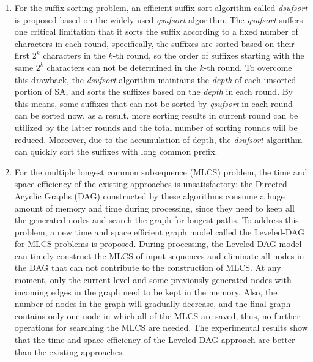 \begin{englishabstract}
\begin{enumerate}
  \item For the suffix sorting problem, an efficient suffix sort
    algorithm called \emph{dsufsort} is proposed based on the widely
    used \emph{qsufsort} algorithm. The \emph{qsufsort} suffers one
    critical limitation that it sorts the suffix according to a fixed
    number of characters in each round, specifically, the suffixes are
    sorted based on their first $2^k$ characters in the $k$-th round,
    so the order of suffixes starting with the same $2^k$ characters
    can not be determined in the $k$-th round. To overcome this
    drawback, the \emph{dsufsort} algorithm maintains the \emph{depth}
    of each unsorted portion of SA, and sorts the suffixes based on
    the \emph{depth} in each round. By this means, some suffixes that
    can not be sorted by \emph{qsufsort} in each round can be sorted
    now, as a result, more sorting results in current round can be
    utilized by the latter rounds and the total number of sorting
    rounds will be reduced. Moreover, due to the accumulation of
    depth, the \emph{dsufsort} algorithm can quickly sort the suffixes
    with long common prefix.

  \item For the multiple longest common subsequence (MLCS) problem,
    the time and space efficiency of the existing approaches is
    unsatisfactory: the Directed Acyclic Graphs (DAG) constructed by
    these algorithms consume a huge amount of memory and time during
    processing, since they need to keep all the generated nodes and
    search the graph for longest paths. To address this problem, a new
    time and space efficient graph model called the Leveled-DAG for
    MLCS problems is proposed. During processing, the Leveled-DAG
    model can timely construct the MLCS of input sequences and
    eliminate all nodes in the DAG that can not contribute to the
    construction of MLCS. At any moment, only the current level and
    some previously generated nodes with incoming edges in the graph
    need to be kept in the memory. Also, the number of nodes in the
    graph will gradually decrease, and the final graph contains only
    one node in which all of the MLCS are saved, thus, no further
    operations for searching the MLCS are needed.  The experimental
    results show that the time and space efficiency of the Leveled-DAG
    approach are better than the existing approaches.
  \end{enumerate}

  \par

\end{englishabstract}

